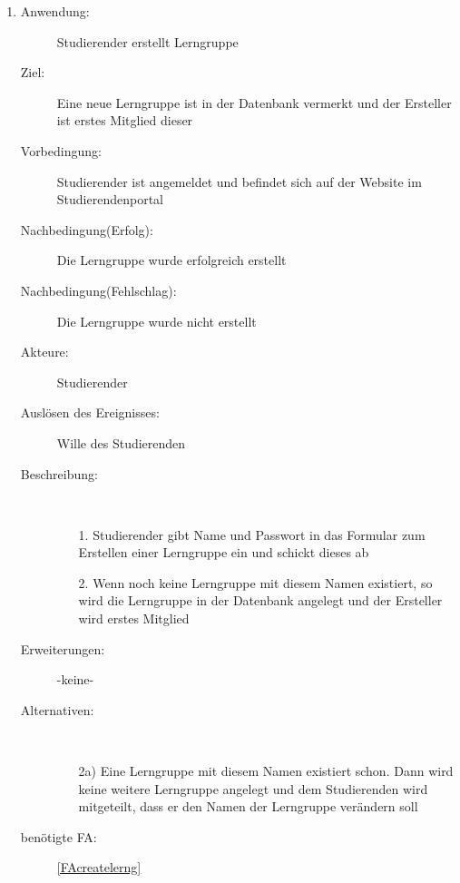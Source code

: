 \documentclass[parskip=full]{scrartcl}
\newcommand{\swtLabel}[1]{\textbf{/#1\arabic*0/}}
\begin{document}
\begin{enumerate}[label=\swtLabel{S}]
  
  \item
  \begin{description}
  \item[Anwendung:] Studierender erstellt Lerngruppe
  \item[Ziel:] Eine neue Lerngruppe ist in der Datenbank vermerkt und der Ersteller ist erstes Mitglied dieser
  	\item[Vorbedingung:] Studierender ist angemeldet und befindet sich auf der
  	Website im Studierendenportal
  	\item[Nachbedingung(Erfolg):] Die Lerngruppe wurde erfolgreich erstellt
  	\item[Nachbedingung(Fehlschlag):] Die Lerngruppe wurde nicht erstellt
  	\item[Akteure:] Studierender
  	\item[Auslösen des Ereignisses:] Wille des Studierenden
  	\item[Beschreibung:]~
  	\begin{enumerate}
  	  \item[1.] Studierender gibt Name und Passwort in das Formular zum Erstellen
  	  einer Lerngruppe ein und schickt dieses ab %
  	  \item[2.] Wenn noch keine Lerngruppe mit diesem Namen existiert, so wird
  	  die Lerngruppe in der Datenbank angelegt und der Ersteller wird erstes Mitglied
  	\end{enumerate}
  	\item[Erweiterungen:] -keine-
  	\item[Alternativen:] ~
  	\begin{enumerate}
  	  \item[2a)] Eine Lerngruppe mit diesem Namen existiert schon. Dann wird
  	  keine weitere Lerngruppe angelegt und dem Studierenden wird mitgeteilt,
  	  dass er den Namen der Lerngruppe verändern soll
  	 \end{enumerate}
  	 \item[benötigte FA:] \ref{FAcreatelerng}
  \end{description}
   

\end{enumerate}
\end{document}
